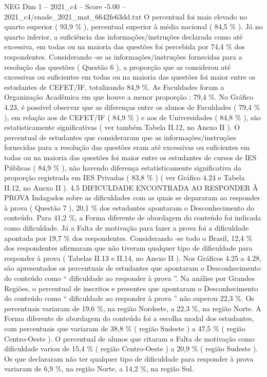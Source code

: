 \begin{textsample}{NEG Dim 1 – 2021\_c4 – Score -5.00 – 2021\_c4/enade\_2021\_mat\_6642fe63dd.txt}
O percentual foi mais elevado no quarto superior ( 93,9 \% ), percentual superior à média nacional ( 84,5 \% ).
Já no quarto inferior, a suficiência das informações/instruções declarada como até excessiva, em todas ou na maioria das questões foi percebida por 74,4 \% dos respondentes.
Considerando -se as informações/instruções fornecidas para a resolução das questões ( Questão 6 ), a proporção que as considerou até excessivas ou suficientes em todas ou na maioria das questões foi maior entre os estudantes de CEFET/IF, totalizando 84,9 \%.
As Faculdades foram a Organização Acadêmica em que houve a menor proporção : 79,4 \%.
No Gráfico 4.23, é possível observar que as diferenças entre os alunos de Faculdades ( 79,4 \% ), em relação aos de CEFET/IF ( 84,9 \% ) e aos de Universidades ( 84,8 \% ), são estatisticamente significativas ( ver também Tabela II.12, no Anexo II ).
O percentual de estudantes que consideraram que as informações/instruções fornecidas para a resolução das questões eram até excessivas ou suficientes em todas ou na maioria das questões foi maior entre os estudantes de cursos de IES Públicas ( 84,9 \% ), não havendo diferença estatisticamente significativa da proporção registrada em IES Privadas ( 83,8 \% ) ( ver Gráfico 4.24 e Tabela II.12, no Anexo II ). 4.5 DIFICULDADE ENCONTRADA AO RESPONDER À PROVA Indagados sobre as dificuldades com as quais se depararam ao responder à prova ( Questão 7 ), 20,1 \% dos estudantes apontaram o Desconhecimento do conteúdo.
Para 41,2 \%, a Forma diferente de abordagem do conteúdo foi indicada como dificuldade.
Já a Falta de motivação para fazer a prova foi a dificuldade apontada por 19,7 \% dos respondentes.
Considerando -se todo o Brasil, 12,4 \% dos respondentes afirmaram que não tiveram qualquer tipo de dificuldade para responder à prova ( Tabelas II.13 e II.14, no Anexo II ).
Nos Gráficos 4.25 a 4.28, são apresentados os percentuais de estudantes que apontaram o Desconhecimento do conteúdo como “ dificuldade ao responder à prova ”.
Na análise por Grandes Regiões, o percentual de inscritos e presentes que apontaram o Desconhecimento do conteúdo como “ dificuldade ao responder à prova ” não superou 22,3 \%.
Os percentuais variaram de 19,6 \%, na região Nordeste, a 22,3 \%, na região Norte.
A Forma diferente de abordagem do conteúdo foi a escolha modal dos estudantes, com percentuais que variaram de 38,8 \% ( região Sudeste ) a 47,5 \% ( região Centro-Oeste ).
O percentual de alunos que citaram a Falta de motivação como dificuldade variou de 15,4 \% ( região Centro-Oeste ) a 20,9 \% ( região Sudeste ).
Os que declararam não ter qualquer tipo de dificuldade para responder à prova variaram de 6,9 \%, na região Norte, a 14,2 \%, na região Sul.

\end{textsample}
